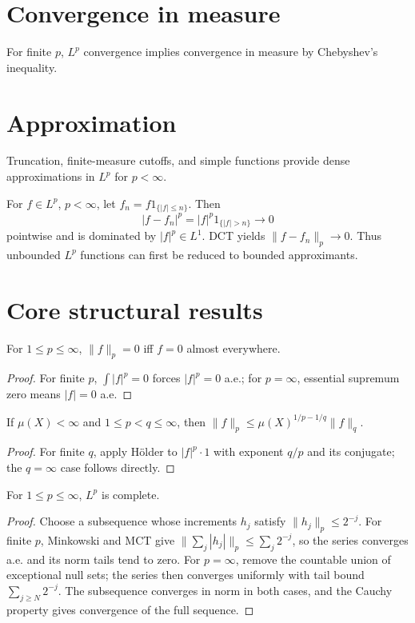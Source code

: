 \section{Convergence in measure}
For finite $p$, $L^p$ convergence implies convergence in measure by Chebyshev's inequality.

\section{Approximation}
Truncation, finite-measure cutoffs, and simple functions provide dense approximations in $L^p$ for $p<\infty$.


\begin{example}\label{ex:iii06-expand-03}
For \(f\in L^p\), \(p<\infty\), let \(f_n=f1_{\{|f|\le n\}}\). Then
\[
|f-f_n|^p=|f|^p1_{\{|f|>n\}}\to0
\]
pointwise and is dominated by \(|f|^p\in L^1\). DCT yields
\(\|f-f_n\|_p\to0\). Thus unbounded \(L^p\) functions can first be reduced to
bounded approximants.
\end{example}
\section{Core structural results}

\begin{theorem}\label{thm:iii06-01}
For $1\le p\le\infty$, $\|f\|_p=0$ iff $f=0$ almost everywhere.
\begin{proof}
For finite $p$, $\int|f|^p=0$ forces $|f|^p=0$ a.e.; for $p=\infty$, essential supremum zero means $|f|=0$ a.e.
\end{proof}
\end{theorem}

\begin{theorem}\label{thm:iii06-02}
If $\mu(X)<\infty$ and $1\le p<q\le\infty$, then $\|f\|_p\le\mu(X)^{1/p-1/q}\|f\|_q$.
\begin{proof}
For finite $q$, apply Hölder to $|f|^p\cdot1$ with exponent $q/p$ and its conjugate; the $q=\infty$ case follows directly.
\end{proof}
\end{theorem}

\begin{theorem}[Completeness of $L^p$]\label{thm:iii06-03}
For $1\le p\le\infty$, $L^p$ is complete.
\begin{proof}
Choose a subsequence whose increments $h_j$ satisfy $\|h_j\|_p\le2^{-j}$. For finite $p$, Minkowski and MCT give $\|\sum_j|h_j|\|_p\le\sum_j2^{-j}$, so the series converges a.e. and its norm tails tend to zero. For $p=\infty$, remove the countable union of exceptional null sets; the series then converges uniformly with tail bound $\sum_{j\ge N}2^{-j}$. The subsequence converges in norm in both cases, and the Cauchy property gives convergence of the full sequence.
\end{proof}
\end{theorem}

